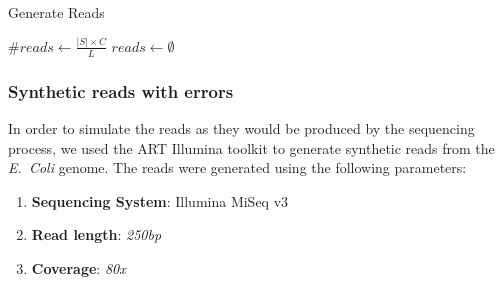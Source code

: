 \begin{algorithm}
  \caption{Generate Reads}\label{alg:generate-reads}
  $\mathit{\#reads} \gets \frac{|S| \times C}{L}$\;
  $reads \gets \emptyset$\;
\end{algorithm}

\subsubsection{Synthetic reads with errors}

In order to simulate the reads as they would be produced by the sequencing process, we used the ART Illumina toolkit to generate
synthetic reads from the \emph{E.~Coli} genome. The reads were generated using the following parameters:

\begin{enumerate}
\item \textbf{Sequencing System}: Illumina MiSeq v3
\item \textbf{Read length}: \textit{250bp}
\item \textbf{Coverage}: \textit{80x}
\end{enumerate}